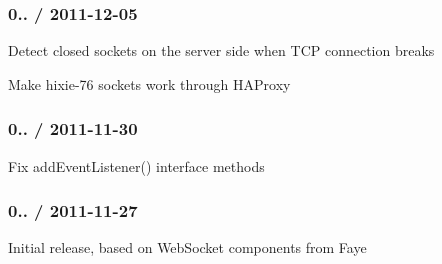 \subsubsection*{0.. / 2011-\/12-\/05}


\begin{DoxyItemize}
\item Detect closed sockets on the server side when T\+CP connection breaks
\item Make {\ttfamily hixie-\/76} sockets work through H\+A\+Proxy
\end{DoxyItemize}

\subsubsection*{0.. / 2011-\/11-\/30}


\begin{DoxyItemize}
\item Fix {\ttfamily add\+Event\+Listener()} interface methods
\end{DoxyItemize}

\subsubsection*{0.. / 2011-\/11-\/27}


\begin{DoxyItemize}
\item Initial release, based on Web\+Socket components from Faye 
\end{DoxyItemize}